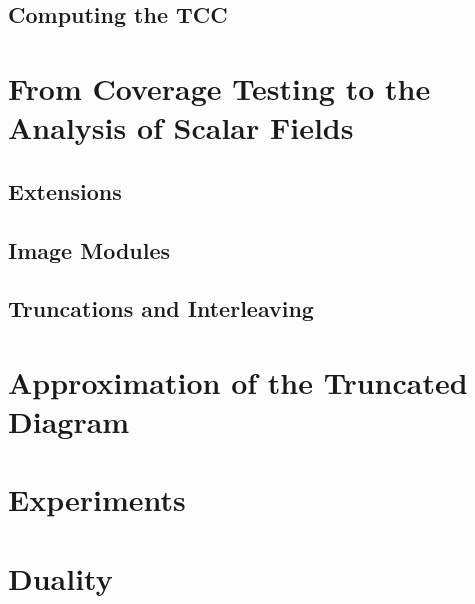 \documentclass[12pt]{article}
\begin{document}
\subsection{Computing the TCC}
  

\section{From Coverage Testing to the Analysis of Scalar Fields}\label{sec:middle}


\subsection{Extensions}
  

\subsection{Image Modules}
  

\subsection{Truncations and Interleaving}\label{sec:interleaving}
  


\section{Approximation of the Truncated Diagram}\label{sec:truncations}


\clearpage
\section{Experiments}
  

\clearpage


%
\appendix
%
\section{Duality}\label{apx:duality}


%
% 
%
\end{document}
